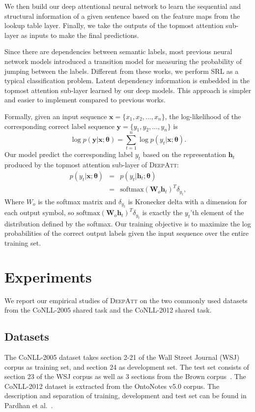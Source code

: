 \documentclass[letterpaper]{article} \usepackage{aaai18}  \usepackage{times}  \usepackage{helvet}  \usepackage{courier}  \usepackage{url}  \usepackage{graphicx}  \frenchspacing  \setlength{\pdfpagewidth}{8.5in}  \setlength{\pdfpageheight}{11in}  \usepackage{latexsym}
\begin{document}
We then build our deep attentional neural network to learn the sequential and structural information of a given sentence based on the feature maps from the lookup table layer. Finally, we take the outputs of the topmost attention sub-layer as inputs to make the final predictions.

Since there are dependencies between semantic labels, most previous neural network models introduced a transition model for measuring the probability of jumping between the labels. Different from these works, we perform SRL as a typical classification problem. Latent dependency information is embedded in the topmost attention sub-layer learned by our deep models. This approach is simpler and easier to implement compared to previous works.

Formally, given an input sequence $\bm{x} = \{x_1, x_2,\ldots,x_n\}$, the log-likelihood of the corresponding correct label sequence $\bm{y} = \{y_1, y_2, \ldots, y_n\}$ is
\begin{equation}
\log p(\bm{y} | \bm{x}; \bm{\theta}) = \sum_{t=1}^{n} \log p(y_t|\bm{x}; \bm{\theta}).
\end{equation}
Our model predict the corresponding label $y_t$ based on the representation $\mathbf{h}_t$ produced by the topmost attention sub-layer of \textsc{DeepAtt}:
\begin{eqnarray}
    p(y_t|\bm{x}; \bm{\theta}) &=& p(y_t|\mathbf{h}_t; \bm{\theta}) \\
    &=& \textrm{softmax}(\mathbf{W}_o\mathbf{h}_t)^T\delta_{y_t},
\end{eqnarray}
Where $W_o$ is the softmax matrix and $\delta_{y_t}$ is Kronecker delta with a dimension for each output symbol, so $\textrm{softmax}(\mathbf{W}_o\mathbf{h}_t)^T\delta_{y_t}$ is exactly the $y_t$'th element of the distribution defined by the softmax. Our training objective is to maximize the log probabilities of the correct output labels given the input sequence over the entire training set.

\section{Experiments}
We report our empirical studies of \textsc{DeepAtt} on the two commonly used datasets from the CoNLL-2005 shared task and the CoNLL-2012 shared task.

\subsection{Datasets}
The CoNLL-2005 dataset takes section 2-21 of the Wall Street Journal (WSJ) corpus as training set, and section 24 as development set. The test set consists of section 23 of the WSJ corpus as well as 3 sections from the Brown corpus~\cite{Carreras-CoNLL2005}. The CoNLL-2012 dataset is extracted from the OntoNotes v5.0 corpus. The description and separation of training, development and test set can be found in Pardhan et al.~.
\end{document}
